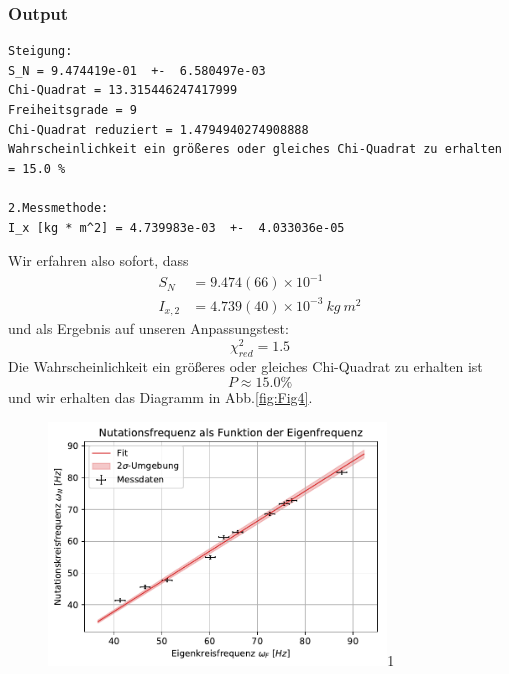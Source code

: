 \documentclass[a4paper,10pt]{article}
\begin{document}
\subsubsection{Output}
\begin{lstlisting}
Steigung: 
S_N = 9.474419e-01  +-  6.580497e-03
Chi-Quadrat = 13.315446247417999
Freiheitsgrade = 9
Chi-Quadrat reduziert = 1.4794940274908888
Wahrscheinlichkeit ein größeres oder gleiches Chi-Quadrat zu erhalten = 15.0 %

2.Messmethode: 
I_x [kg * m^2] = 4.739983e-03  +-  4.033036e-05
\end{lstlisting}
Wir erfahren also sofort, dass
\begin{align*}
S_{N}&=9.474(66)\times10^{-1}\\
I_{x,2}&=4.739(40)\times10^{-3}\:kg\: m^2
\end{align*}
und als Ergebnis auf unseren Anpassungstest:
\[\chi^{2}_{red}=1.5\]
Die Wahrscheinlichkeit ein größeres oder gleiches Chi-Quadrat zu erhalten ist
 \[P\approx  15.0 \%\]
und wir erhalten das Diagramm in Abb.\ref{fig:Fig4}.
\begin{figure}[htb]
  \centering
  \begin{annotate}{\includegraphics[width=0.8\textwidth]{213_Fig5.pdf}}{1}
  \end{annotate}
\caption{}
\label{fig:Fig5}
\end{figure}
\end{document}
